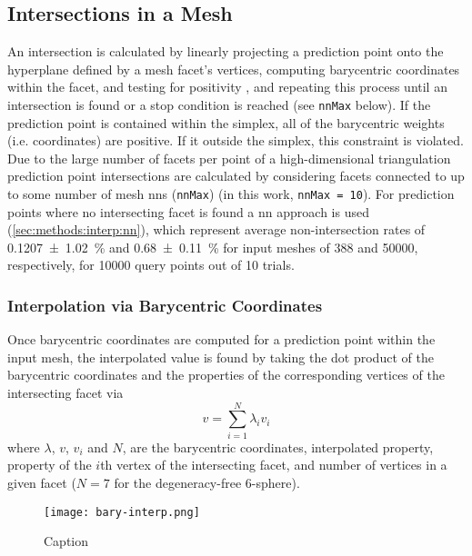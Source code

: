 \subsection{Intersections in a  Mesh}
\label{app:bary-int}
An intersection is calculated by linearly projecting a prediction point onto the hyperplane defined by a mesh facet's vertices, computing barycentric coordinates within the facet, and testing for positivity \cite{langerSphericalBarycentricCoordinates2006}, and repeating this process until an intersection is found or a stop condition is reached (see \texttt{nnMax} below). If the prediction point is contained within the simplex, all of the barycentric weights (i.e. coordinates) are positive. If it outside the simplex, this constraint is violated. Due to the large number of facets per point of a high-dimensional
triangulation
prediction point intersections are calculated by considering facets connected to up to some number of mesh \glspl{nn} (\texttt{nnMax}) (in this work, \texttt{nnMax = 10}). For prediction points where no intersecting facet is found
a \gls{nn} approach is used (\cref{sec:methods:interp:nn}), which represent average non-intersection rates of \SI{0.1207 \pm 1.02}{\percent} and \SI{0.68 \pm 0.11}{\percent} for input meshes of \num{388} and \num{50000}, respectively, for \num{10000} query points out of \num{10} trials.

\subsubsection{Interpolation via Barycentric Coordinates}
\label{app:bary-interp}

Once barycentric coordinates are computed for a prediction point within the input mesh, the interpolated value is found by taking the dot product of the barycentric coordinates and the properties of the corresponding vertices of the intersecting facet via
\begin{equation}
v=\underset{i=1}{\overset{N}{\sum }}\lambda _i v_i
\end{equation}
where $\lambda$, $v$, $v_i$ and $N$, are the barycentric coordinates, interpolated property, property of the $i$th vertex of the intersecting facet, and number of vertices in a given facet ($N = 7$ for the degeneracy-free 6-sphere).

\begin{figure}
    \centering
    \texttt{[image: bary-interp.png]}
    \caption{Caption}
    \label{fig:my_label}
\end{figure}